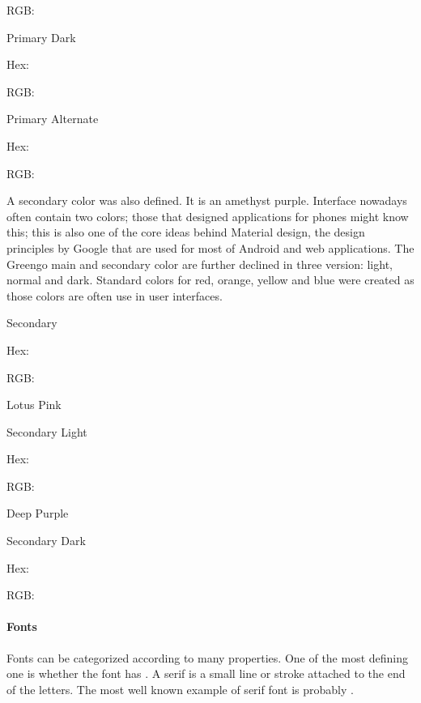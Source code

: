 \documentclass[letterpaper,10pt,english]{sphinxmanual}
\begin{document}
RGB: 


Primary Dark

Hex: 

RGB: 


Primary Alternate

Hex: 

RGB: 

A secondary color was also defined.
It is an amethyst purple.
Interface nowadays often contain two colors; those that designed applications for phones might know this; this is also one of the core ideas behind Material design, the design principles by Google that are used for most of Android and web applications.
The Greengo main and secondary color are further declined in three version: light, normal and dark.
Standard colors for red, orange, yellow and blue were created as those colors are often use in user interfaces.


Secondary

Hex: 

RGB: 

Lotus Pink

Secondary Light

Hex: 

RGB: 

Deep Purple

Secondary Dark

Hex: 

RGB: 


\paragraph{Fonts}
\label{\detokenize{blog/2020/01/branding:fonts}}
Fonts can be categorized according to many properties.
One of the most defining one is whether the font has .
A serif is a small line or stroke attached to the end of the letters.
The most well known example of serif font is probably .
\end{document}
